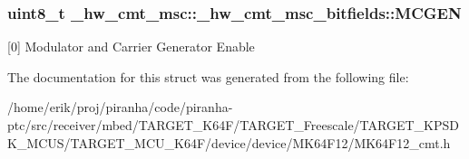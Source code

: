 \subsubsection[{\texorpdfstring{M\+C\+G\+EN}{MCGEN}}]{\setlength{\rightskip}{0pt plus 5cm}uint8\+\_\+t \+\_\+hw\+\_\+cmt\+\_\+msc\+::\+\_\+hw\+\_\+cmt\+\_\+msc\+\_\+bitfields\+::\+M\+C\+G\+EN}\hypertarget{struct__hw__cmt__msc_1_1__hw__cmt__msc__bitfields_a210e1d713c948666eae5496a4e37d613}{}\label{struct__hw__cmt__msc_1_1__hw__cmt__msc__bitfields_a210e1d713c948666eae5496a4e37d613}
\mbox{[}0\mbox{]} Modulator and Carrier Generator Enable 

The documentation for this struct was generated from the following file\+:\begin{DoxyCompactItemize}
\item 
/home/erik/proj/piranha/code/piranha-\/ptc/src/receiver/mbed/\+T\+A\+R\+G\+E\+T\+\_\+\+K64\+F/\+T\+A\+R\+G\+E\+T\+\_\+\+Freescale/\+T\+A\+R\+G\+E\+T\+\_\+\+K\+P\+S\+D\+K\+\_\+\+M\+C\+U\+S/\+T\+A\+R\+G\+E\+T\+\_\+\+M\+C\+U\+\_\+\+K64\+F/device/device/\+M\+K64\+F12/M\+K64\+F12\+\_\+cmt.\+h\end{DoxyCompactItemize}
